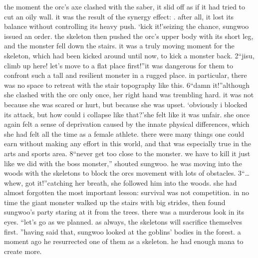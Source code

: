 the moment the orc’s axe clashed with the saber, it slid off as if it had tried to cut an oily wall.
 it was the result of the synergy effect: .
 after all, it lost its balance without controlling its heavy push.
‘kick it!’seizing the chance, sungwoo issued an order.
 the skeleton then pushed the orc’s upper body with its short leg, and the monster fell down the stairs.
it was a truly moving moment for the skeleton, which had been kicked around until now, to kick a monster back.
2“jisu, climb up here! let’s move to a flat place first!”it was dangerous for them to confront such a tall and resilient monster in a rugged place.
 in particular, there was no space to retreat with the stair topography like this.
6“damn it!”although she clashed with the orc only once, her right hand was trembling hard.
 it was not because she was scared or hurt, but because she was upset.
‘obviously i blocked its attack, but how could i collapse like that?’she felt like it was unfair.
 she once again felt a sense of deprivation caused by the innate physical differences, which she had felt all the time as a female athlete.
 there were many things one could earn without making any effort in this world, and that was especially true in the arts and sports area.
8“never get too close to the monster.
 we have to kill it just like we did with the boss monster,” shouted sungwoo.
 he was moving into the woods with the skeletons to block the orcs movement with lots of obstacles.
3“…whew, got it!”catching her breath, she followed him into the woods.
 she had almost forgotten the most important lesson: survival was not competition.
in no time the giant monster walked up the stairs with big strides, then found sungwoo’s party staring at it from the trees.
 there was a murderous look in its eyes.
“let’s go as we planned.
 as always, the skeletons will sacrifice themselves first.
”having said that, sungwoo looked at the goblins’ bodies in the forest.
 a moment ago he resurrected one of them as a skeleton.
 he had enough mana to create more.

